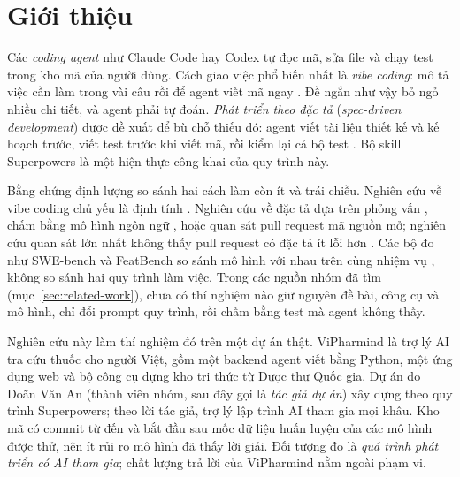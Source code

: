 \section{Giới thiệu}\label{sec:introduction}

Các \emph{coding agent} như Claude Code hay Codex tự đọc mã, sửa file và chạy
test trong kho mã của người dùng. Cách giao việc phổ biến nhất là \emph{vibe coding}: mô tả việc cần làm trong
vài câu rồi để agent viết mã ngay \cite{chou_2025,fawzy_2026}. Đề ngắn như vậy bỏ ngỏ nhiều chi tiết, và
agent phải tự đoán. \emph{Phát triển theo đặc tả} (\emph{spec-driven development}) được đề xuất để bù chỗ thiếu đó: agent viết tài liệu
thiết kế và kế hoạch trước, viết test trước khi viết mã, rồi kiểm lại cả bộ test
\cite{agarwal_2026,diaz_2026}. Bộ skill Superpowers \cite{vincent_superpowers} là một hiện thực công khai của quy trình này.

Bằng chứng định lượng so sánh hai cách làm còn ít và trái chiều. Nghiên cứu về vibe coding chủ yếu là định
tính \cite{chou_2025,fawzy_2026}. Nghiên cứu về đặc tả dựa trên phỏng vấn \cite{agarwal_2026}, chấm bằng mô
hình ngôn ngữ \cite{taghavi_2026}, hoặc quan sát pull request mã nguồn mở; nghiên cứu quan sát lớn nhất
không thấy pull request có đặc tả ít lỗi hơn \cite{hill_2026}. Các bộ đo như SWE-bench và FeatBench so
sánh mô hình với nhau trên cùng nhiệm vụ \cite{jimenez_2024,chen_2025}, không so sánh hai quy trình làm
việc. Trong các nguồn nhóm đã tìm (mục~\ref{sec:related-work}), chưa có thí nghiệm nào giữ nguyên đề bài,
công cụ và mô hình, chỉ đổi prompt quy trình, rồi chấm bằng test mà agent không thấy.

Nghiên cứu này làm thí nghiệm đó trên một dự án thật. ViPharmind là trợ lý AI tra cứu thuốc cho người Việt,
gồm một backend agent viết bằng Python, một ứng dụng web và bộ công cụ dựng kho tri thức từ Dược thư Quốc
gia. Dự án do Doãn Văn An (thành viên nhóm, sau đây gọi là \emph{tác giả dự án}) xây dựng theo quy trình
Superpowers; theo lời tác giả, trợ lý lập trình AI tham gia mọi khâu. Kho mã có \NumCommits{} commit từ \mbox{\NumFirstDate{}}
đến \mbox{\NumLastDate{}} và bắt đầu sau mốc dữ liệu huấn luyện của các mô hình được thử, nên ít rủi ro mô
hình đã thấy lời giải. Đối tượng đo là \emph{quá trình phát triển có AI tham gia}; chất lượng trả lời của
ViPharmind nằm ngoài phạm vi.

